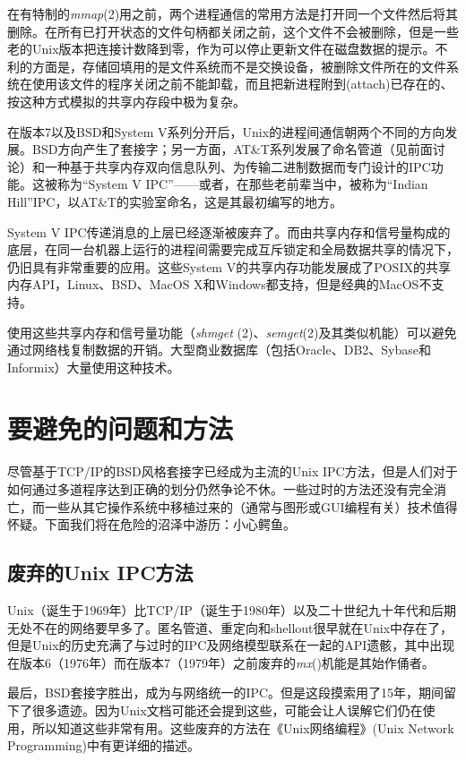 \documentclass[12pt,oneside]{book}
\begin{document}
在有特制的\textit{mmap}(2)用之前，两个进程通信的常用方法是打开同一个文件然后将其删除。在所有已打开状态的文件句柄都关闭之前，这个文件不会被删除，但是一些老的Unix版本把连接计数降到零，作为可以停止更新文件在磁盘数据的提示。不利的方面是，存储回填用的是文件系统而不是交换设备，被删除文件所在的文件系统在使用该文件的程序关闭之前不能卸载，而且把新进程附到(attach)已存在的、按这种方式模拟的共享内存段中极为复杂。

在版本7以及BSD和System V系列分开后，Unix的进程间通信朝两个不同的方向发展。BSD方向产生了套接字；另一方面，AT\&{}T系列发展了命名管道（见前面讨论）和一种基于共享内存双向信息队列、为传输二进制数据而专门设计的IPC功能。这被称为“System V IPC”——或者，在那些老前辈当中，被称为“Indian Hill”IPC，以AT\&{}T的实验室命名，这是其最初编写的地方。

System V IPC传递消息的上层已经逐渐被废弃了。而由共享内存和信号量构成的底层，在同一台机器上运行的进程间需要完成互斥锁定和全局数据共享的情况下，仍旧具有非常重要的应用。这些System V的共享内存功能发展成了POSIX的共享内存API，Linux、BSD、MacOS X和Windows都支持，但是经典的MacOS不支持。

使用这些共享内存和信号量功能（\textit{shmget }(2)、\textit{semget}(2)及其类似机能）可以避免通过网络栈复制数据的开销。大型商业数据库（包括Oracle、DB2、Sybase和Informix）大量使用这种技术。



\section{要避免的问题和方法}
尽管基于TCP/IP的BSD风格套接字已经成为主流的Unix IPC方法，但是人们对于如何通过多道程序达到正确的划分仍然争论不休。一些过时的方法还没有完全消亡，而一些从其它操作系统中移植过来的（通常与图形或GUI编程有关）技术值得怀疑。下面我们将在危险的沼泽中游历：小心鳄鱼。


\subsection{废弃的Unix IPC方法}
Unix（诞生于1969年）比TCP/IP（诞生于1980年）以及二十世纪九十年代和后期无处不在的网络要早多了。匿名管道、重定向和shellout很早就在Unix中存在了，但是Unix的历史充满了与过时的IPC及网络模型联系在一起的API遗骸，其中出现在版本6（1976年）而在版本7（1979年）之前废弃的\textit{mx}()机能是其始作俑者。

最后，BSD套接字胜出，成为与网络统一的IPC。但是这段摸索用了15年，期间留下了很多遗迹。因为Unix文档可能还会提到这些，可能会让人误解它们仍在使用，所以知道这些非常有用。这些废弃的方法在《Unix网络编程》(Unix Network Programming)\cite{Stevens90}中有更详细的描述。
\end{document}

